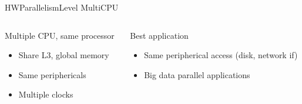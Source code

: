 %
\begin{Frame}{HWParallelismLevel MultiCPU}
  \begin{columns}[t]
    \begin{column}{5cm} %
      \begin{block}{Multiple CPU, same processor}
        \begin{itemize}
        \item Share L3, global memory
        \item Same periphericals
        \item Multiple clocks
        \end{itemize}
      \end{block} 
    \end{column}
    
    \begin{column}{5cm} %
      \begin{block}{Best application}
        \begin{itemize}
        \item Same peripherical access (disk, network if)
        \item Big data parallel applications
        \end{itemize}
      \end{block}   
    \end{column}
  \end{columns}  
\end{Frame}


